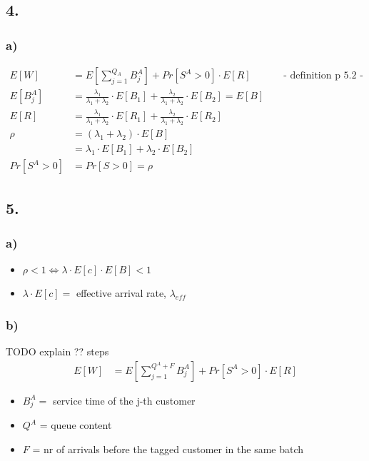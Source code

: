 \subsection*{ 4. }

\subsubsection*{ a) }

\begin{align*}
E\left[W\right]&=E\left[\sum _{{j=1}}^{{Q_{A}}}B_{j}^{A}\right]+Pr\left[S^{A}> 0\right]\cdot E\left[R\right] && \text{ - definition p 5.2 - } \\
E\left[B_{j}^{A}\right]&=\frac{\lambda _{1}}{\lambda _{1}+\lambda _{2}}\cdot E\left[B_{1}\right]+\frac{\lambda _{2}}{\lambda _{1}+\lambda _{2}}\cdot E\left[B_{2}\right]=E\left[B\right]\\
E\left[R\right]&=\frac{\lambda _{1}}{\lambda _{1}+\lambda _{2}}\cdot E\left[R_{1}\right]+\frac{\lambda _{2}}{\lambda _{1}+\lambda _{2}}\cdot E\left[R_{2}\right]\\
\rho &=\left(\lambda _{1}+\lambda _{2}\right)\cdot E\left[B\right]\\
&=\lambda_{1} \cdot E\left[B_{1}\right]+\lambda_{2} \cdot E\left[B_{2}\right]\\
Pr\left[S^{A}> 0\right]&=Pr\left[S> 0\right]=\rho 
\end{align*}

\subsection*{ 5. }

\subsubsection*{ a) }

\begin{itemize}
\item  $\rho < 1 \Leftrightarrow \lambda \cdot E\left[c\right]\cdot E\left[B\right]< 1$
\item  $\lambda \cdot E\left[c\right]=$ effective arrival rate, $\lambda _{{eff}}$
\end{itemize}

\subsubsection*{ b) }

TODO explain ?? steps
\begin{align*}
E\left[W\right]&=E\left[\sum _{{j=1}}^{{Q^{A}+F}}B_{j}^{A}\right]+Pr\left[S^{A}> 0\right]\cdot E\left[R\right]
\end{align*}
\begin{itemize}
\item  $B_{j}^{A}=$ service time of the j-th customer
\item  $Q^{A}$ = queue content
\item  $F$ = nr of arrivals before the tagged customer in the same batch
\end{itemize}

